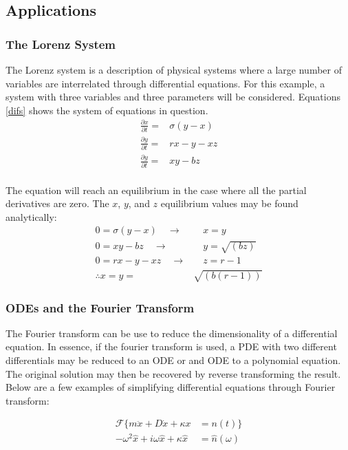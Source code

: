 \documentclass[twocolumn]{article}
\begin{document}
\subsection{Applications}
\subsubsection{The Lorenz System}
The Lorenz system is a description of physical systems where a large number of variables are interrelated through differential equations. For this example, a system with three variables and three parameters will be considered. Equations \ref{difs} shows the system of equations in question.
\begin{equation} \label{difs}
\begin{split}
\frac{\partial x}{\partial t} =& \sigma (y - x) \\
\frac{\partial y}{\partial t} =& rx - y - xz \\
\frac{\partial y}{\partial t} =& xy - bz \\
\end{split}
\end{equation}

The equation will reach an equilibrium in the case where all the partial derivatives are zero. The $x$, $y$, and $z$ equilibrium values may be found analytically:
\begin{equation} \label{equilibrium}
\begin{split}
0 = \sigma (y - x) \quad \to  & \quad x = y\\
0 = xy - bz \quad \to & \quad y = \sqrt{(bz)}\\
0 = rx - y - xz \quad \to & \quad z = r-1\\
\therefore x = y =& \sqrt{(b(r-1))}
\end{split}
\end{equation}

\subsubsection{ODEs and the Fourier Transform}
The Fourier transform can be use to reduce the dimensionality of a differential equation. In essence, if the fourier transform is used, a PDE with two different differentials may be reduced to an ODE or and ODE to a polynomial equation. The original solution may then be recovered by reverse transforming the result. Below are a few examples of simplifying differential equations through Fourier transform:

\begin{equation}
\begin{split}
\mathcal{F} \{ m\ddot{x} + D\dot{x} + \kappa x &= n(t) \} \\
-\omega^2 \hat{x} +i\omega \hat{x} + \kappa\hat{x} &= \hat{n}(\omega)
\end{split}
\end{equation}
\end{document}
